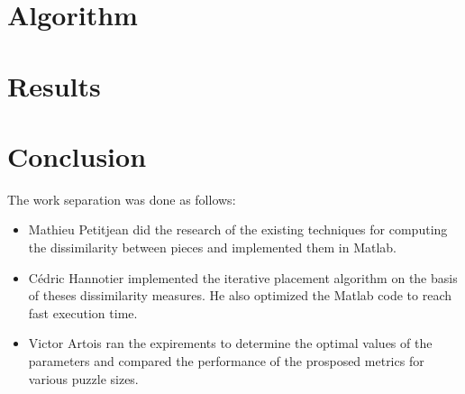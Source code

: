 \documentclass[conference,english, 12pt,a4paper]{IEEEtran}
\begin{document}
\section{Algorithm}


\section{Results}



\section{Conclusion}



\appendix

The work separation was done as follows: \begin{itemize}
    \item Mathieu Petitjean did the research of the existing techniques for computing the dissimilarity between pieces and implemented them in Matlab.
    
    \item Cédric Hannotier implemented the iterative placement algorithm on the basis of theses dissimilarity measures. He also optimized the Matlab code to reach fast execution time.
    
    \item Victor Artois ran the expirements to determine the optimal values of the parameters and compared the performance of the prosposed metrics for various puzzle sizes.
\end{itemize}

\ifCLASSOPTIONcaptionsoff
  \newpage
\fi

\printbibliography
\end{document}
